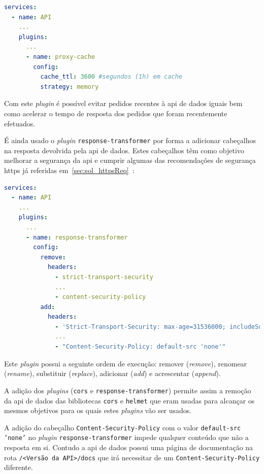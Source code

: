 \begin{lstlisting}[language=yaml, caption=Configuração declarativa do \textit{Kong}: \textit{plugin} \texttt{proxy-cache}]
services:
  - name: API
    ...
    plugins:
      ...
      - name: proxy-cache
        config:
          cache_ttl: 3600 #segundos (1h) em cache
          strategy: memory
\end{lstlisting}

Com este \textit{plugin} é possível evitar pedidos recentes à \acrshort{api} de dados iguais bem como acelerar o tempo de resposta dos pedidos que foram recentemente efetuados.

É ainda usado o \textit{plugin} \texttt{response-transformer} por forma a adicionar cabeçalhos na resposta devolvida pela \acrshort{api} de dados. Estes cabeçalhos têm como objetivo melhorar a segurança da \acrshort{api} e cumprir algumas das recomendações de segurança \acrshort{https} já referidas em~\ref{sec:sol_httpsReq}~\cite{kongResponseTransformer}:

\begin{lstlisting}[language=yaml, caption=Configuração declarativa do \textit{Kong}: \textit{plugin} \texttt{response-transformer}]
services:
  - name: API
    ...
    plugins:
      ...
      - name: response-transformer
        config:
          remove:
            headers:
              - strict-transport-security
              ...
              - content-security-policy
          add:
            headers:
              - 'Strict-Transport-Security: max-age=31536000; includeSubDomains; preload'
              ...
              - "Content-Security-Policy: default-src 'none'"
\end{lstlisting}

Este \textit{plugin} possui a seguinte ordem de execução: remover (\textit{remove}), renomear (\textit{rename}), substituir (\textit{replace}), adicionar (\textit{add}) e acrescentar (\textit{append}).

A adição dos \textit{plugins} (\texttt{cors} e \texttt{response-transformer}) permite assim a remoção da \acrshort{api} de dados das bibliotecas \texttt{cors} e \texttt{helmet} que eram usadas para alcançar os mesmos objetivos para os quais estes \textit{plugins} vão ser usados.

A adição do cabeçalho \texttt{Content-Security-Policy} com o valor \texttt{default-src 'none'} no \textit{plugin} \texttt{response-transformer} impede qualquer conteúdo que não a resposta em si. Contudo a \acrshort{api} de dados possui uma página de documentação na rota \texttt{/<Versão da API>/docs} que irá necessitar de um \texttt{Content-Security-Policy} diferente. 

